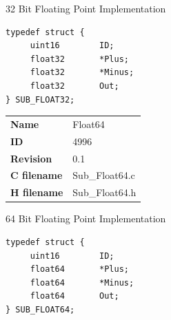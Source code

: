 32 Bit Floating Point Implementation

\begin{lstlisting}
typedef struct {
     uint16        ID;
     float32       *Plus;
     float32       *Minus;
     float32       Out;
} SUB_FLOAT32;
\end{lstlisting}

\ifdefined \AddTestReports
{}
\fi
{}
\nopagebreak[0]
\begin{tabular}{l l}
\textbf{Name} & Float64 \tabularnewline
\textbf{ID} & 4996 \tabularnewline
\textbf{Revision} & 0.1 \tabularnewline
\textbf{C filename} & Sub\_Float64.c \tabularnewline
\textbf{H filename} & Sub\_Float64.h \tabularnewline
\end{tabular}
\vspace{1ex}

64 Bit Floating Point Implementation

\begin{lstlisting}
typedef struct {
     uint16        ID;
     float64       *Plus;
     float64       *Minus;
     float64       Out;
} SUB_FLOAT64;
\end{lstlisting}

\ifdefined \AddTestReports
{}
\fi
